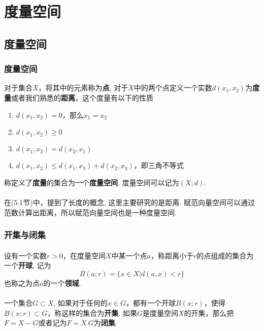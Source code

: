 \section{度量空间}

\subsection{度量空间}

\subsubsection{度量空间}
对于集合$X$，将其中的元素称为\textbf{点}, 对于$X$中的两个点定义一个实数$d(x_1, x_2)$为\textbf{度量}或者我们熟悉的\textbf{距离}，这个度量有以下的性质
\begin{enumerate}
\item $d(x_1, x_2) = 0$，那么$x_1 = x_2$
\item $d(x_1, x_2) \geq 0$
\item $d(x_1, x_2) = d(x_2, x_1)$
\item $d(x_1, x_2) \leq d(x_1, x_3) + d(x_2, x_3)$，即三角不等式
\end{enumerate}
称定义了\textbf{度量}的集合为一个\textbf{度量空间}. 度量空间可以记为$(X; d)$.

\paragraph{}
在(5.1节)中，提到了长度的概念, 这里主要研究的是距离. 赋范向量空间可以通过范数计算出距离，所以赋范向量空间也是一种度量空间.

\subsubsection{开集与闭集}
\paragraph{}
设有一个实数$r > 0$，在度量空间$X$中某一个点$a$，称距离小于$r$的点组成的集合为一个\textbf{开球}, 记为
$$
B(a; r) = \{ x\in X| d(a, x) < r\}
$$
也称之为点$a$的一个\textbf{领域}.

\paragraph{}
一个集合$G \subset X$, 如果对于任何的$x \in G$，都有一个开球$B(x; r)$，使得$B(x; r) \subset G$，称这样的集合为\textbf{开集}. 如果$G$是度量空间$X$的开集，那么把$F = X - G$或者记为$F = X \ G$为\textbf{闭集}.  

